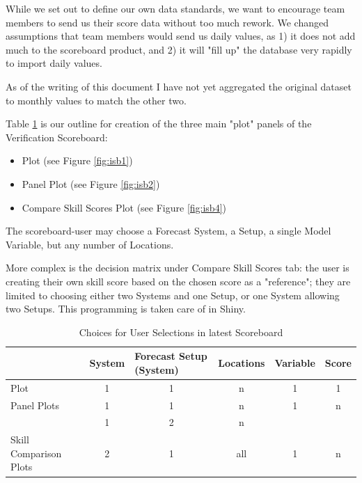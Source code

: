 \documentclass[logos,parttoc,morelanguage=french,morelanguage=german]{orsay-memoire}
\begin{document}
While we set out to define our own data standards, we want to encourage team members to send us their score data without too much rework. We changed assumptions that team members would send us daily values, as 1) it does not add much to the scoreboard product, and 2) it will "fill up" the database very rapidly to import daily values.

As of the writing of this document I have not yet aggregated the original dataset to monthly values to match the other two.

Table \ref{tbl:selectOptions2} is our outline for creation of the three main "plot" panels of the Verification Scoreboard: 
\begin{itemize}
\item Plot (see Figure \ref{fig:isb1})
\item Panel Plot (see Figure \ref{fig:isb2})
\item Compare Skill Scores Plot  (see Figure \ref{fig:isb4})
\end{itemize}

The \gls{scoreboard-user} may choose a Forecast System, a Setup, a single Model Variable, but any number of Locations.

More complex is the decision matrix under Compare Skill Scores tab: the user is creating their own skill score based on the chosen score as a "reference"; they are limited to choosing either two Systems and one Setup, or one System allowing two Setups. This programming is taken care of in Shiny.

\begin{table}[h]
\centering
\begin{tabular}{@{}lccccc@{}}
\toprule
 & \multicolumn{1}{l}{System} & \multicolumn{1}{l}{Forecast Setup (System)} & \multicolumn{1}{l}{Locations} & \multicolumn{1}{l}{Variable} & \multicolumn{1}{l}{Score} \\ \midrule
Plot & \cellcolor[HTML]{FFFFFF}1 & \cellcolor[HTML]{FFFFFF}1 & \cellcolor[HTML]{FFFFFF}n & \cellcolor[HTML]{FFFFFF}1 & \cellcolor[HTML]{FFFFFF}1 \\
Panel Plots & \cellcolor[HTML]{FFFFFF}1 & \cellcolor[HTML]{FFFFFF}1 & \cellcolor[HTML]{FFFFFF}n & \cellcolor[HTML]{FFFFFF}1 & \cellcolor[HTML]{FFFFFF}n \\
 & \cellcolor[HTML]{FFFFFF}1 & \cellcolor[HTML]{CBCEFB}2 & \cellcolor[HTML]{FFFFFF}n & \cellcolor[HTML]{FFFFFF} & \cellcolor[HTML]{FFFFFF} \\
\multirow{-2}{*}{Skill Comparison Plots} & \cellcolor[HTML]{CBCEFB}2 & \cellcolor[HTML]{FFFFFF}1 & \cellcolor[HTML]{CBCEFB}all & \multirow{-2}{*}{\cellcolor[HTML]{FFFFFF}1} & \multirow{-2}{*}{\cellcolor[HTML]{FFFFFF}n} \\ \cmidrule(lr){2-4}
\end{tabular}
\caption{Choices for User Selections in latest Scoreboard}
\label{tbl:selectOptions2}
\end{table}
\end{document}
